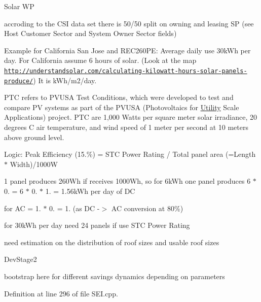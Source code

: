 \begin{DoxyRefDesc}{Solar W\+P}
\item[\hyperlink{wp__wp000003}{Solar W\+P}]accroding to the C\+S\+I data set there is 50/50 split on owning and leasing S\+P (see Host Customer Sector and System Owner Sector fields)\end{DoxyRefDesc}


Example for California San Jose and R\+E\+C260\+P\+E\+: Average daily use 30k\+Wh per day. For California assume 6 hours of solar. (Look at the map \href{http://understandsolar.com/calculating-kilowatt-hours-solar-panels-produce/}{\tt http\+://understandsolar.\+com/calculating-\/kilowatt-\/hours-\/solar-\/panels-\/produce/}) It is k\+Wh/m2/day.

P\+T\+C refers to P\+V\+U\+S\+A Test Conditions, which were developed to test and compare P\+V systems as part of the P\+V\+U\+S\+A (Photovoltaics for \hyperlink{classsolar__core_1_1_utility}{Utility} Scale Applications) project. P\+T\+C are 1,000 Watts per square meter solar irradiance, 20 degrees C air temperature, and wind speed of 1 meter per second at 10 meters above ground level.

Logic\+: Peak Efficiency (15.\%) = S\+T\+C Power Rating / Total panel area (=Length $\ast$ Width)/1000\+W

1 panel produces 260\+Wh if receives 1000\+Wh, so for 6k\+Wh one panel produces 6 $\ast$ 0. = 6 $\ast$ 0. $\ast$ 1. = 1.\+56k\+Wh per day of D\+C

for A\+C = 1. $\ast$ 0. = 1. (as D\+C -\/$>$ A\+C conversion at 80\%)

for 30k\+Wh per day need 24 panels if use S\+T\+C Power Rating

need estimation on the distribution of roof sizes and usable roof sizes \begin{DoxyRefDesc}{Dev\+Stage2}
\item[\hyperlink{_dev_stage2__DevStage2000014}{Dev\+Stage2}]bootstrap here for different savings dynamics depending on parameters \end{DoxyRefDesc}


Definition at line 296 of file S\+E\+I.\+cpp.



